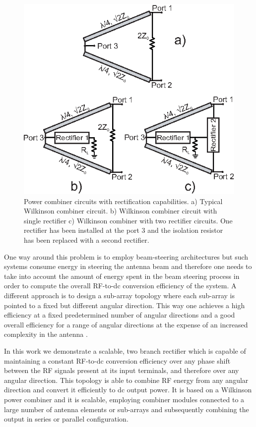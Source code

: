 \documentclass[journal]{IEEEtran}
\begin{document}
\begin{figure}[t]
\centering
\includegraphics[width=0.8\columnwidth]{Figures/Fig1.eps}
\caption{Power combiner circuits with rectification capabilities. a) Typical Wilkinson combiner circuit.    
b) Wilkinson combiner circuit with single rectifier c) Wilkinson combiner  with two rectifier circuits. One rectifier has been installed at the port  $3$ and the isolation resistor has been replaced with a second rectifier.}
\label{fig:1}
\end{figure}

One way around this problem is to employ beam-steering
architectures but such systems consume energy in steering the
antenna beam and therefore one needs to take into account
the amount of energy spent in the beam steering process in
order to compute the overall RF-to-dc conversion efficiency
of the system. 
%
A different approach is to design a sub-array topology where each sub-array is pointed to a fixed
but different angular direction.
%
 This way one achieves a
high efficiency at a fixed predetermined number of angular
directions and a  good overall efficiency for a range of angular directions
at the expense of an increased complexity in the antenna 
\cite{lee2017hybrid}.
%


In this work we demonstrate a scalable, two branch rectifier which is capable of maintaining a constant RF-to-dc conversion efficiency over any phase shift between the RF
signals present at its input terminals, and therefore over any
angular direction.
%
This topology
is able to combine RF energy from any angular direction
and convert it efficiently to dc output power. It is based on
a Wilkinson power combiner and it is scalable, employing
combiner modules connected to a large number of antenna
elements or sub-arrays and subsequently combining the output
in series or parallel configuration.
\end{document}
